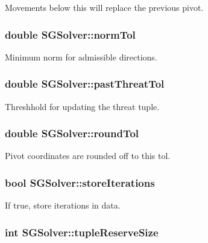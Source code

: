 Movements below this will replace the previous pivot. \hypertarget{class_s_g_solver_a85a9df04ac9b440de3c8ce500b31e5e4}{
\subsubsection[{norm\+Tol}]{\setlength{\rightskip}{0pt plus 5cm}double S\+G\+Solver\+::norm\+Tol\hspace{0.3cm}{\ttfamily [private]}}}\label{class_s_g_solver_a85a9df04ac9b440de3c8ce500b31e5e4}
Minimum norm for admissible directions. \hypertarget{class_s_g_solver_ad28b55baedb592f299009f606a19237a}{
\subsubsection[{past\+Threat\+Tol}]{\setlength{\rightskip}{0pt plus 5cm}double S\+G\+Solver\+::past\+Threat\+Tol\hspace{0.3cm}{\ttfamily [private]}}}\label{class_s_g_solver_ad28b55baedb592f299009f606a19237a}
Threshhold for updating the threat tuple. \hypertarget{class_s_g_solver_aa87ee9134ca87c67038cadb61d4cc8d0}{
\subsubsection[{round\+Tol}]{\setlength{\rightskip}{0pt plus 5cm}double S\+G\+Solver\+::round\+Tol\hspace{0.3cm}{\ttfamily [private]}}}\label{class_s_g_solver_aa87ee9134ca87c67038cadb61d4cc8d0}
Pivot coordinates are rounded off to this tol. \hypertarget{class_s_g_solver_aedfe0d946d73a4e4af52c5b28624b944}{
\subsubsection[{store\+Iterations}]{\setlength{\rightskip}{0pt plus 5cm}bool S\+G\+Solver\+::store\+Iterations\hspace{0.3cm}{\ttfamily [private]}}}\label{class_s_g_solver_aedfe0d946d73a4e4af52c5b28624b944}
If true, store iterations in data. \hypertarget{class_s_g_solver_a0e68d667b3865d738cdd969cba67d942}{
\subsubsection[{tuple\+Reserve\+Size}]{\setlength{\rightskip}{0pt plus 5cm}int S\+G\+Solver\+::tuple\+Reserve\+Size\hspace{0.3cm}{\ttfamily [private]}}}\label{class_s_g_solver_a0e68d667b3865d738cdd969cba67d942}
